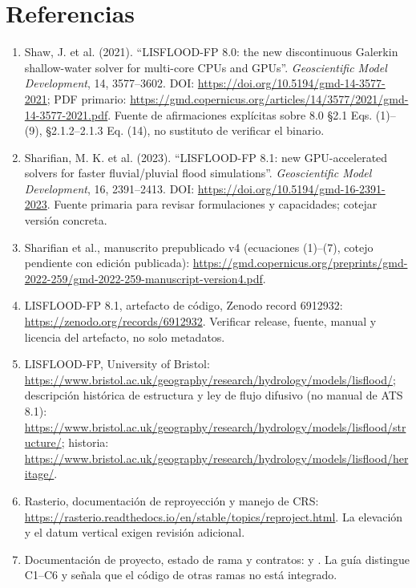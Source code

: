 \documentclass[11pt,a4paper]{article}
\begin{document}
\section{Referencias}
\begin{enumerate}
\item Shaw, J. et al. (2021). ``LISFLOOD-FP 8.0: the new discontinuous Galerkin shallow-water solver for multi-core CPUs and GPUs''. \emph{Geoscientific Model Development}, 14, 3577--3602. DOI: \url{https://doi.org/10.5194/gmd-14-3577-2021}; PDF primario: \url{https://gmd.copernicus.org/articles/14/3577/2021/gmd-14-3577-2021.pdf}. Fuente de afirmaciones explícitas sobre 8.0 §2.1 Eqs. (1)--(9), §2.1.2--2.1.3 Eq. (14), no sustituto de verificar el binario.
\item Sharifian, M. K. et al. (2023). ``LISFLOOD-FP 8.1: new GPU-accelerated solvers for faster fluvial/pluvial flood simulations''. \emph{Geoscientific Model Development}, 16, 2391--2413. DOI: \url{https://doi.org/10.5194/gmd-16-2391-2023}. Fuente primaria para revisar formulaciones y capacidades; cotejar versión concreta.
\item Sharifian et al., manuscrito prepublicado v4 (ecuaciones (1)--(7), cotejo pendiente con edición publicada): \url{https://gmd.copernicus.org/preprints/gmd-2022-259/gmd-2022-259-manuscript-version4.pdf}.
\item LISFLOOD-FP 8.1, artefacto de código, Zenodo record 6912932: \url{https://zenodo.org/records/6912932}. Verificar release, fuente, manual y licencia del artefacto, no solo metadatos.
\item LISFLOOD-FP, University of Bristol: \url{https://www.bristol.ac.uk/geography/research/hydrology/models/lisflood/}; descripción histórica de estructura y ley de flujo difusivo (no manual de ATS 8.1): \url{https://www.bristol.ac.uk/geography/research/hydrology/models/lisflood/structure/}; historia: \url{https://www.bristol.ac.uk/geography/research/hydrology/models/lisflood/heritage/}.
\item Rasterio, documentación de reproyección y manejo de CRS: \url{https://rasterio.readthedocs.io/en/stable/topics/reproject.html}. La elevación y el datum vertical exigen revisión adicional.
\item Documentación de proyecto, estado de rama y contratos:  y . La guía distingue C1--C6 y señala que el código de otras ramas no está integrado.
\end{enumerate}
\end{document}
